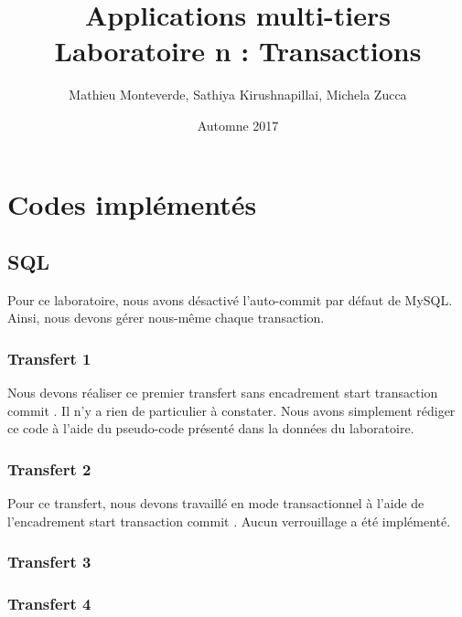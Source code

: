\documentclass[11pt, a4paper, french, twoside]{article}
\title{Applications multi-tiers \\ Laboratoire n\textordmasculine2 : Transactions}
\author{Mathieu Monteverde, Sathiya Kirushnapillai, Michela Zucca}
\date{Automne 2017}
\begin{document}
	
	\maketitle
	
	\setlength{\parskip}{1em}
	
	\section{Codes implémentés}
    
    \subsection{SQL}
    Pour ce laboratoire, nous avons désactivé l'auto-commit par défaut de MySQL. Ainsi, nous devons gérer nous-même chaque transaction. 
    
	
    
    \subsubsection*{Transfert 1}
    Nous devons réaliser ce premier transfert sans encadrement \og start transaction commit \fg. Il n'y a rien de particulier à constater. Nous avons simplement rédiger ce code à l'aide du pseudo-code présenté dans la données du laboratoire.
    
    
    
    \subsubsection*{Transfert 2}
    Pour ce transfert, nous devons travaillé en mode transactionnel à l'aide de l'encadrement \og start transaction commit \fg. Aucun verrouillage a été implémenté.
    
    
    
    \subsubsection*{Transfert 3}
    
    \subsubsection*{Transfert 4}
    
\end{document}
